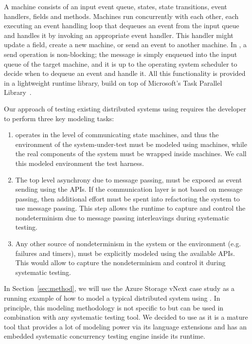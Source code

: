 A \psharp machine consists of an input event queue, states, state transitions, event handlers, fields and methods. Machines run concurrently with each other, each executing an event handling loop that dequeues an event from the input queue and handles it by invoking an appropriate event handler. This handler might update a field, create a new machine, or send an event to another machine. In \psharp, a send operation is non-blocking; the message is simply enqueued into the input queue of the target machine, and it is up to the operating system scheduler to decide when to dequeue an event and handle it. All this functionality is provided in a lightweight runtime library, build on top of Microsoft's Task Parallel Library~\cite{leijen2009tpl}.

Our approach of testing existing distributed systems using \psharp requires the developer to perform three key modeling tasks:

\begin{enumerate}
\item \psharp operates in the level of communicating state machines, and thus the environment of the system-under-test must be modeled using \psharp machines, while the real components of the system must be wrapped inside \psharp machines. We call this modeled environment the \psharp test harness.

\item The top level asynchrony due to message passing, must be exposed as event sending using the \psharp APIs. If the communication layer is not based on message passing, then additional effort must be spent into refactoring the system to use message passing. This step allows the \psharp runtime to capture and control the nondeterminism due to message passing interleavings during systematic testing.

\item Any other source of nondeterminism in the system or the environment (e.g. failures and timers), must be explicitly modeled using the available \psharp APIs. This would allow \psharp to capture the nondeterminism and control it during systematic testing.
\end{enumerate}

In Section~\ref{sec:method}, we will use the Azure Storage vNext case study as a running example of how to model a typical distributed system using \psharp.
In principle, this modeling methodology is not specific to \psharp but can be used in combination with any systematic testing tool.
We decided to use \psharp as it is a mature tool that provides a lot of modeling power via its \csharp language extensions and has an embedded systematic concurrency testing engine inside its runtime.

